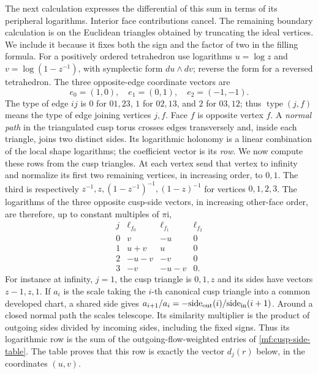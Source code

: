 \documentclass[11pt]{article}
\numberwithin{equation}{section}
\theoremstyle{definition}
\theoremstyle{remark}
\newcommand{\ii}{\mathrm i}
\begin{document}
The next calculation expresses the differential of this sum in terms
of its peripheral logarithms. Interior face contributions cancel.
The remaining boundary calculation is on the Euclidean triangles
obtained by truncating the ideal vertices. We include it because it
fixes both the sign and the factor of two in the filling formula. For a positively
ordered tetrahedron use logarithms \(u=\log z\) and
\(v=\log(1-z^{-1})\), with symplectic form \(du\wedge dv\);
reverse the form for a reversed tetrahedron.
The three opposite-edge coordinate vectors are
\[
                 e_0=(1,0),\quad e_1=(0,1),\quad e_2=(-1,-1).
\]
The type of edge \(ij\) is \(0\) for \(01,23\), \(1\) for
\(02,13\), and \(2\) for \(03,12\); thus
\(\operatorname{type}(j,f)\) means the type of edge joining
vertices \(j,f\). Face \(f\) is opposite vertex \(f\).
A \emph{normal path} in the triangulated cusp torus crosses edges
transversely and, inside each triangle, joins two distinct sides.
Its logarithmic holonomy is a linear combination of the local shape
logarithms; the coefficient vector is its \emph{row}. We now compute
these rows from the cusp triangles.
At each vertex send that vertex to infinity and normalize its first
two remaining vertices, in increasing order, to \(0,1\).
The third is respectively
\(z^{-1},z,(1-z^{-1})^{-1},(1-z)^{-1}\) for vertices \(0,1,2,3\).
The logarithms of the three opposite cusp-side vectors, in increasing
other-face order, are therefore, up to constant multiples of \(\pi\ii\),
\begin{equation}\label{mf:cusp-side-table}
\begin{array}{c|ccc}
 j&\ell_{f_0}&\ell_{f_1}&\ell_{f_2}\\ \hline
 0&v&-u&0\\
 1&u+v&u&0\\
 2&-u-v&-v&0\\
 3&-v&-u-v&0 .
\end{array}
\end{equation}
For instance at infinity, \(j=1\), the cusp triangle is \(0,1,z\)
and its sides have vectors \(z-1,z,1\).
If \(a_i\) is the scale taking the \(i\)-th canonical cusp triangle
into a common developed chart, a shared side gives
\(a_{i+1}/a_i=-\mathrm{side}_{\rm out}(i)/
\mathrm{side}_{\rm in}(i+1)\). Around a closed normal path the scales
telescope. Its similarity multiplier is the product of
outgoing sides divided by incoming sides, including the fixed signs.
Thus its logarithmic row is the sum of the outgoing-flow-weighted
entries of \eqref{mf:cusp-side-table}. The table proves that this row
is exactly the vector \(d_j(r)\) below, in the coordinates \((u,v)\).
\end{document}
